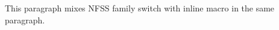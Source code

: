 This paragraph mixes NFSS family switch \sffamily with inline \textsf{macro} in the same paragraph.

